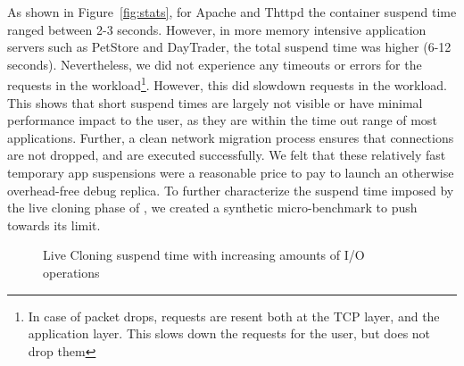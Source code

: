 As shown in Figure~\ref{fig:stats}, for Apache and Thttpd the container suspend time ranged between 2-3 seconds.
However, in more memory intensive application servers such as PetStore and DayTrader, the total suspend time was higher (6-12 seconds).
Nevertheless, we did not experience any timeouts or errors for the requests in the workload\footnote{In case of packet drops, requests are resent both at the TCP layer, and the application layer. This slows down the requests for the user, but does not drop them}.
However, this did slowdown requests in the workload. 
This shows that short suspend times are largely not visible or have minimal performance impact to the user, as they are within the time out range of most applications.
Further, a clean network migration process ensures that connections are not dropped, and are executed successfully.
We felt that these relatively fast temporary app suspensions were a reasonable price to pay to launch an otherwise overhead-free debug replica.
To further characterize the suspend time imposed by the live cloning phase of \parikshan, we created a synthetic micro-benchmark to push \parikshan towards its limit.
\begin{figure}[ht]
	\centering
	\caption{Live Cloning suspend time with increasing amounts of I/O operations }
	\label{fig:fioResults}
\end{figure}



